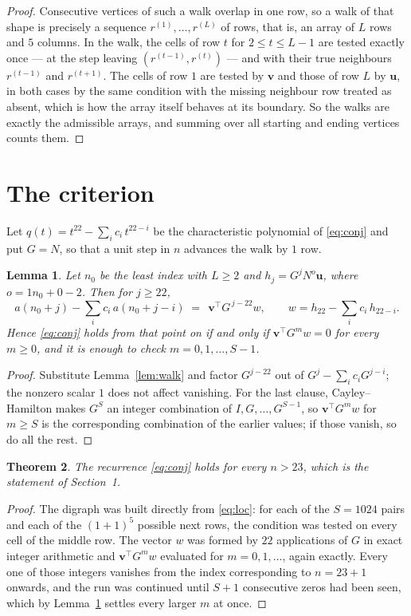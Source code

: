 \documentclass[11pt,a4paper]{article}
\theoremstyle{plain}
\newtheorem{theorem}{Theorem}
\newtheorem{lemma}[theorem]{Lemma}
\theoremstyle{definition}
\begin{document}
\begin{proof}
Consecutive vertices of such a walk overlap in one row, so a walk of that shape is
precisely a sequence $r^{(1)},\dots,r^{(L)}$ of rows, that is, an array of $L$ rows
and $5$ columns. In the walk, the cells of row $t$ for $2\le t\le L-1$ are tested
exactly once --- at the step leaving $(r^{(t-1)},r^{(t)})$ --- and with their true
neighbours $r^{(t-1)}$ and $r^{(t+1)}$. The cells of row $1$ are tested by
$\mathbf{v}$ and those of row $L$ by $\mathbf{u}$, in both cases by the same condition
with the missing neighbour row treated as absent, which is how the array itself behaves at
its boundary. So the walks are exactly the admissible arrays, and summing over all starting
and ending vertices counts them.
\end{proof}

\section{The criterion}

Let $q(t)=t^{22}-\sum_i c_i\,t^{22-i}$ be the characteristic polynomial of
\eqref{eq:conj} and put $G=N$, so that a unit step in $n$ advances the walk by
$1$ row.

\begin{lemma}\label{lem:crit}
Let $n_0$ be the least index with $L\ge2$ and $h_j=G^{j}N^{o}\mathbf{u}$, where
$o=1n_0+0-2$. Then for $j\ge22$,
\[
a(n_0+j)-\sum_i c_i\,a(n_0+j-i)\;=\;\,\mathbf{v}^{\!\top}G^{\,j-22}w,
\qquad w=h_{22}-\sum_i c_i\,h_{22-i} .
\]
Hence \eqref{eq:conj} holds from that point on if and only if
$\mathbf{v}^{\!\top}G^{m}w=0$ for every $m\ge0$, and it is enough to check
$m=0,1,\dots,S-1$.
\end{lemma}

\begin{proof}
Substitute Lemma~\ref{lem:walk} and factor $G^{j-22}$ out of
$G^{j}-\sum_ic_iG^{j-i}$; the nonzero scalar $1$ does not affect
vanishing. For the last clause, Cayley--Hamilton makes $G^{S}$ an integer combination of
$I,G,\dots,G^{S-1}$, so $\mathbf{v}^{\!\top}G^{m}w$ for $m\ge S$ is the corresponding
combination of the earlier values; if those vanish, so do all the rest.
\end{proof}

\begin{theorem}
The recurrence \eqref{eq:conj} holds for every $n>23$, which is the statement of
Section~1.
\end{theorem}

\begin{proof}
The digraph was built directly from \eqref{eq:loc}: for each of the $S=1024$ pairs and each
of the $(1+1)^{5}$ possible next rows, the condition was tested on every cell of
the middle row. The vector $w$ was formed by $22$ applications of $G$ in exact integer
arithmetic and $\mathbf{v}^{\!\top}G^{m}w$ evaluated for $m=0,1,\dots$, again exactly.
Every one of those integers vanishes from the index corresponding to $n=23+1$ onwards,
and the run was continued until $S+1$ consecutive zeros had been seen, which by
Lemma~\ref{lem:crit} settles every larger $m$ at once.
\end{proof}
\end{document}

